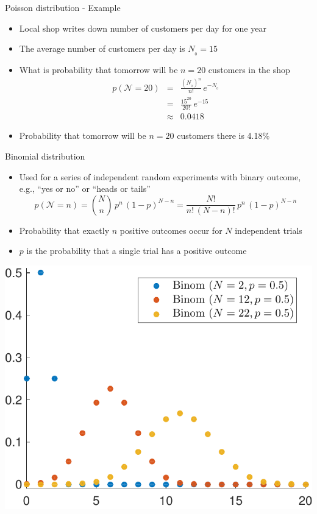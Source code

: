 \begin{frame}{Poisson distribution - Example}
    \begin{itemize}
        \item Local shop writes down number of customers per day for one year
        \item The average number of customers per day is $N_{_0}=15$
        \item What is probability that tomorrow will be $n=20$ customers in the shop
              \begin{eqnarray}
                  p(\mathcal{N}=20) &=& \frac{(N_{_0})^n}{n!}\,e^{-N_{_0}}\nonumber\\[0.5cm]
                  &=&  \frac{15^{20}}{20!}\,e^{-15} \nonumber\\[0.5cm]
                  &\approx& 0.0418 \nonumber
                  \label{eq:sdf}
              \end{eqnarray}
        \item Probability that tomorrow will be $n=20$ customers there is 4.18\%
    \end{itemize}
\end{frame}

\begin{frame}{Binomial distribution}
    \begin{itemize}
        \item Used for a series of independent random experiments with binary outcome, e.g., ``yes or no'' or ``heads or tails''
              \begin{equation*}
                  p(\mathcal{N}=n)=\binom{N}{n}\,p^n\,(1-p)^{N-n} = \frac{N!}{n!\,(N-n)!}\,p^n\,(1-p)^{N-n}
              \end{equation*}
        \item Probability that exactly $n$ positive outcomes occur for $N$ independent trials
        \item $p$ is the probability that a single trial has a positive outcome
    \end{itemize}\vspace{0cm}
    \begin{center}
        \includegraphics[width=0.3\columnwidth]{images/Binomi}%
    \end{center}
\end{frame}

